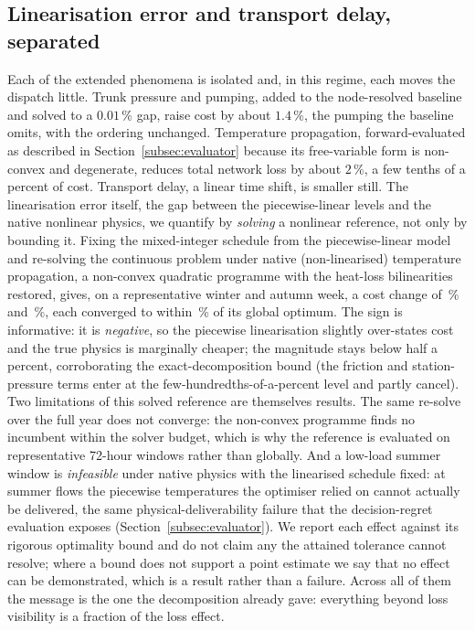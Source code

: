 \documentclass[a4paper,fleqn]{cas-sc}
\begin{document}
\subsection{Linearisation error and transport delay, separated}
\label{subsec:linearisation}
Each of the extended phenomena is isolated and, in this regime, each moves the dispatch little.
Trunk pressure and pumping, added to the node-resolved baseline and solved to a $0.01$\,\%
gap, raise cost by about $1.4$\,\%, the pumping the baseline omits, with the ordering
unchanged. Temperature propagation, forward-evaluated as described in Section~\ref{subsec:evaluator}
because its free-variable form is non-convex and degenerate, reduces total network loss by about
$2$\,\%, a few tenths of a percent of cost. Transport delay, a linear time shift, is smaller
still. The linearisation error itself, the gap between the piecewise-linear levels and the
native nonlinear physics, we quantify by \emph{solving} a nonlinear reference, not only by
bounding it. Fixing the mixed-integer schedule from the piecewise-linear model and re-solving the
continuous problem under native (non-linearised) temperature propagation, a non-convex quadratic
programme with the heat-loss bilinearities restored, gives, on a representative winter and autumn
week, a cost change of \,\% and \,\%,
each converged to within \,\% of its global optimum. The sign is
informative: it is \emph{negative}, so the piecewise linearisation slightly over-states cost and
the true physics is marginally cheaper; the magnitude stays below half a percent, corroborating
the exact-decomposition bound (the friction and station-pressure terms enter at the
few-hundredths-of-a-percent level and partly cancel). Two limitations of this solved reference are
themselves results. The same re-solve over the full year does not converge: the non-convex
programme finds no incumbent within the solver budget, which is why the reference is evaluated on
representative 72-hour windows rather than globally. And a low-load summer window is \emph{infeasible} under
native physics with the linearised schedule fixed: at summer flows the piecewise temperatures the
optimiser relied on cannot actually be delivered, the same physical-deliverability failure that the
decision-regret evaluation exposes (Section~\ref{subsec:evaluator}). We report each effect against
its rigorous optimality bound and do not claim any the attained tolerance cannot resolve; where a
bound does not support a point estimate we say that no effect can be demonstrated, which is a
result rather than a failure. Across all of them the message is the one the decomposition
already gave: everything beyond loss visibility is a fraction of the loss effect.

\end{document}

